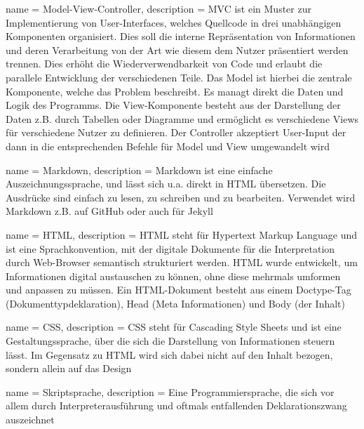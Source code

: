  {
    name = Model-View-Controller,
    description = {
        MVC ist ein Muster zur Implementierung von User-Interfaces, welches 
        Quellcode in drei unabhängigen Komponenten organisiert. Dies soll die 
        interne Repräsentation von Informationen und deren Verarbeitung von der 
        Art wie diesem dem Nutzer präsentiert werden trennen. Dies erhöht die 
        Wiederverwendbarkeit von Code und erlaubt die parallele Entwicklung der 
        verschiedenen Teile. Das Model ist hierbei die zentrale Komponente, 
        welche das Problem beschreibt. Es managt direkt die Daten und Logik des 
        Programms. Die View-Komponente besteht aus der Darstellung der Daten 
        z.B. durch Tabellen oder Diagramme und ermöglicht es verschiedene Views 
        für verschiedene Nutzer zu definieren.
        Der Controller akzeptiert User-Input der dann in die entsprechenden 
        Befehle für Model und View umgewandelt wird
    }
}

 {
    name = Markdown,
    description = {
        Markdown ist eine einfache Auszeichnungssprache, und lässt sich u.a. 
        direkt in HTML übersetzen. Die Ausdrücke sind einfach zu lesen, zu 
        schreiben und zu bearbeiten. 
        Verwendet wird Markdown z.B. auf GitHub oder auch für Jekyll
    }
}

 {
    name = HTML,
    description = {
        HTML steht für Hypertext Markup Language und ist eine Sprachkonvention, 
        mit der digitale Dokumente für die Interpretation durch Web-Browser 
        semantisch strukturiert werden. HTML wurde entwickelt, um Informationen 
        digital austauschen zu können, ohne diese mehrmals umformen und anpassen 
        zu müssen. Ein HTML-Dokument besteht aus einem Doctype-Tag 
        (Dokumenttypdeklaration), Head 
        (Meta Informationen) und Body (der Inhalt)
    }
}

 {
    name = CSS,
    description = {
        CSS steht für Cascading Style Sheets und ist eine Gestaltungssprache, 
        über die sich die Darstellung von Informationen steuern lässt. Im 
        Gegensatz zu HTML wird sich dabei nicht auf den Inhalt bezogen, sondern 
        allein auf das Design
    }
}

 {
    name = Skriptsprache,
    description = {
        Eine Programmiersprache, die sich vor allem durch Interpreterausführung 
        und oftmals entfallenden Deklarationszwang auszeichnet
    }
}

